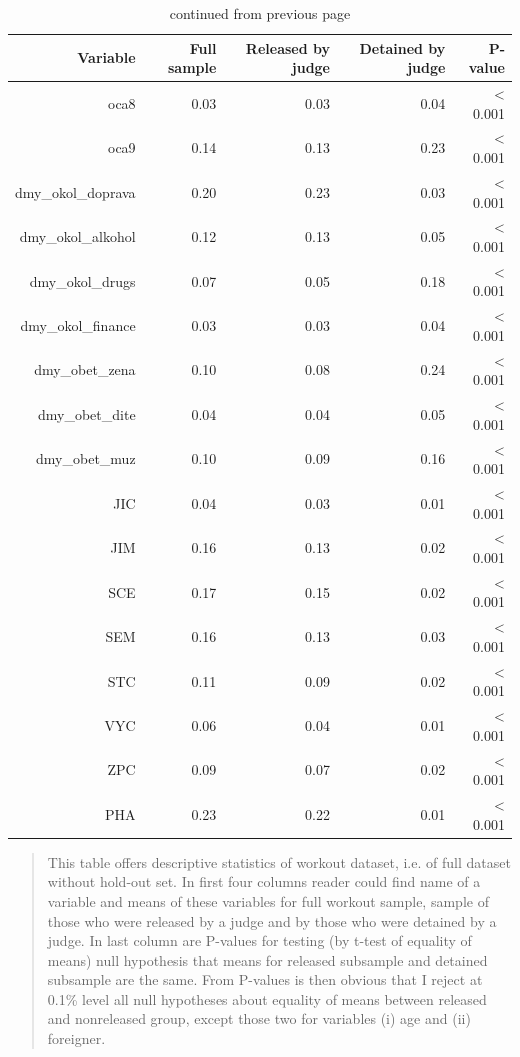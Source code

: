 \documentclass[12pt, twoside]{book} %
\begin{document}
\begin{table}[H]
\centering
\begin{tabular}{rrrrr}
  \hline
 Variable & Full sample & Released by judge & Detained by judge & P-value \\ 
  \hline
  oca8 & 0.03 & 0.03 & 0.04 & < 0.001 \\ 
  oca9 & 0.14 & 0.13 & 0.23 & < 0.001 \\ 
  dmy\_okol\_doprava & 0.20 & 0.23 & 0.03 & < 0.001 \\ 
  dmy\_okol\_alkohol & 0.12 & 0.13 & 0.05 & < 0.001 \\ 
  dmy\_okol\_drugs & 0.07 & 0.05 & 0.18 & < 0.001 \\ 
  dmy\_okol\_finance & 0.03 & 0.03 & 0.04 & < 0.001 \\ 
  dmy\_obet\_zena & 0.10 & 0.08 & 0.24 & < 0.001 \\ 
  dmy\_obet\_dite & 0.04 & 0.04 & 0.05 & < 0.001 \\ 
  dmy\_obet\_muz & 0.10 & 0.09 & 0.16 & < 0.001 \\ 
  JIC & 0.04 & 0.03 & 0.01 & < 0.001 \\ 
  JIM & 0.16 & 0.13 & 0.02 & < 0.001 \\ 
  SCE & 0.17 & 0.15 & 0.02 & < 0.001 \\ 
  SEM & 0.16 & 0.13 & 0.03 & < 0.001 \\ 
  STC & 0.11 & 0.09 & 0.02 & < 0.001 \\ 
  VYC & 0.06 & 0.04 & 0.01 & < 0.001 \\ 
  ZPC & 0.09 & 0.07 & 0.02 & < 0.001 \\ 
  PHA & 0.23 & 0.22 & 0.01 & < 0.001 \\ 
   \hline
\end{tabular}

\renewcommand\thetable{2.3}
 \caption{continued from previous page}
\medskip
{\small 
\begin{quotation}
This table offers descriptive statistics of workout dataset, i.e. of full dataset without hold-out set. In first four columns reader could find name of a variable and means of these variables for full workout sample, sample of those who were released by a judge and by those who were detained by a judge. In last column are P-values for testing (by t-test of equality of means) null hypothesis that means for released subsample and detained subsample are the same. From P-values is then obvious that I reject at 0.1\% level all null hypotheses about equality of means between released and nonreleased group, except those two for variables (i) age and (ii) foreigner.
\end{quotation}
}

\end{table}
\end{document}
